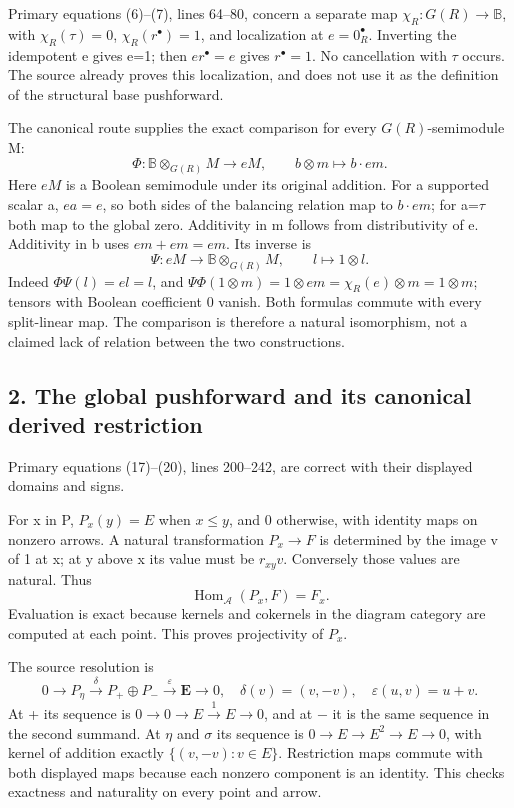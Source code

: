 \documentclass[10pt,a4paper,oneside]{report}
\begin{document}
Primary equations (6)--(7), lines 64--80, concern a separate map \(\chi_R:G(R)\to\mathbb B\), with \(\chi_R(\tau)=0\), \(\chi_R(r^\bullet)=1\), and localization at \(e=0_R^\bullet\). Inverting the idempotent e gives e=1; then \(er^\bullet=e\) gives \(r^\bullet=1\). No cancellation with \(\tau\) occurs. The source already proves this localization, and does not use it as the definition of the structural base pushforward.

The canonical route supplies the exact comparison for every \(G(R)\)-semimodule M: \[
\Phi:\mathbb B\otimes_{G(R)}M\longrightarrow eM,
\qquad b\otimes m\longmapsto b\cdot em.
\] Here \(eM\) is a Boolean semimodule under its original addition. For a supported scalar a, \(ea=e\), so both sides of the balancing relation map to \(b\cdot em\); for a=\(\tau\) both map to the global zero. Additivity in m follows from distributivity of e. Additivity in b uses \(em+em=em\). Its inverse is \[
\Psi:eM\longrightarrow\mathbb B\otimes_{G(R)}M,
\qquad l\longmapsto1\otimes l.
\] Indeed \(\Phi\Psi(l)=el=l\), and \(\Psi\Phi(1\otimes m)=1\otimes em=\chi_R(e)\otimes m=1\otimes m\); tensors with Boolean coefficient 0 vanish. Both formulas commute with every split-linear map. The comparison is therefore a natural isomorphism, not a claimed lack of relation between the two constructions.

\subsection{2. The global pushforward and its canonical derived restriction}\label{proof01:source-maps-the-global-pushforward-and-its-canonical-derived-restriction}

Primary equations (17)--(20), lines 200--242, are correct with their displayed domains and signs.

For x in P, \(P_x(y)=E\) when \(x\leq y\), and 0 otherwise, with identity maps on nonzero arrows. A natural transformation \(P_x\to F\) is determined by the image v of 1 at x; at y above x its value must be \(r_{xy}v\). Conversely those values are natural. Thus \[
\operatorname{Hom}_{\mathcal A}(P_x,F)=F_x.
\] Evaluation is exact because kernels and cokernels in the diagram category are computed at each point. This proves projectivity of \(P_x\).

The source resolution is \[
0\longrightarrow P_\eta\xrightarrow{\delta}P_+\oplus P_-
\xrightarrow{\varepsilon}\mathbf E\longrightarrow0,
\quad\delta(v)=(v,-v),\quad\varepsilon(u,v)=u+v.
\] At + its sequence is \(0\to0\to E\xrightarrow{1}E\to0\), and at \(-\) it is the same sequence in the second summand. At \(\eta\) and \(\sigma\) its sequence is \(0\to E\to E^2\to E\to0\), with kernel of addition exactly \(\{(v,-v):v\in E\}\). Restriction maps commute with both displayed maps because each nonzero component is an identity. This checks exactness and naturality on every point and arrow.
\end{document}
